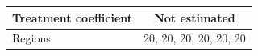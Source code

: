 \begingroup
\centering
\begin{tabular}{lc}
\toprule
Treatment coefficient & Not estimated\\
\midrule
Regions & 20, 20, 20, 20, 20, 20\\
\bottomrule
\end{tabular}
\par\endgroup
